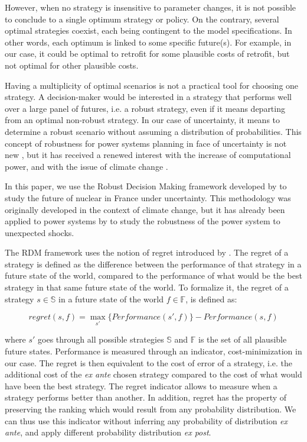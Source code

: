 However, when no strategy is insensitive to parameter changes, it is not possible to conclude to a single optimum strategy or policy. On the contrary, several optimal strategies coexist, each being contingent to the model specifications. In other words, each optimum is linked to some specific future(s). For example, in our case, it could be optimal to retrofit for some plausible costs of retrofit, but not optimal for other plausible costs. 

Having a multiplicity of optimal scenarios is not a practical tool for choosing one strategy. A decision-maker would be interested in a strategy that performs well over a large panel of futures, i.e. a robust strategy, even if it means departing from an optimal non-robust strategy. 
In our case of uncertainty, it means to determine a robust scenario without assuming a distribution of probabilities. This concept of robustness for power systems planning in face of uncertainty is not new \citep{Burke1988, Linares2002}, but it has received a renewed interest with the increase of computational power, and with the issue of climate change \citep{Hallegatte2009}.

In this paper, we use the Robust Decision Making framework developed by \citet{Lempert2006} to study the future of nuclear in France under uncertainty. This methodology was originally developed in the context of climate change, but it has already been applied to power systems by \citet{Nahmmacher2016} to study the robustness of the power system to unexpected shocks. 

The RDM framework uses the notion of regret introduced by \citet{Savage1950}. The regret of a strategy is defined as the difference between the performance of that strategy in a future state of the world, compared to the performance of what would be the best strategy in that same future state of the world. To formalize it, the regret of a strategy $s \in \mathbb{S}$ in a future state of the world $f \in \mathbb{F}$, is defined as:

$$regret(s,f) = \max_{s'} \{Performance(s',f)\}-Performance(s,f)$$

where $s'$ goes through all possible strategies $\mathbb{S}$ and $\mathbb{F}$ is the set of all plausible future states. Performance is measured through an indicator, cost-minimization in our case. The regret is then equivalent to the cost of error of a strategy, i.e. the additional cost of the \textit{ex ante} chosen strategy compared to the cost of what would have been the best strategy.
The regret indicator allows to measure when a strategy performs better than another. In addition, regret has the property of preserving the ranking which would result from any probability distribution. We can thus use this indicator without inferring any probability of distribution \textit{ex ante}, and apply different probability distribution \textit{ex post}.

